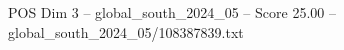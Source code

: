 \begin{textsample}{POS Dim 3 – global\_south\_2024\_05 – Score 25.00 – global\_south\_2024\_05/108387839.txt}
\end{textsample}
